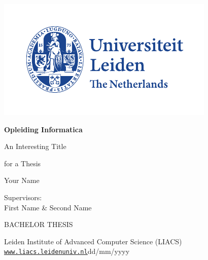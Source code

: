 \thispagestyle{empty}

\includegraphics{logoleiden}

\vspace{-2.5cm}\hfill \begin{huge}\textbf{Opleiding Informatica}\end{huge}

\vspace{5cm}
\begin{Large}
\hfill An Interesting Title

\vspace*{3mm}

\hfill for a Thesis

\vspace*{14mm}

\hfill Your Name
\end{Large}

\vspace*{6.0cm}

\begin{large}

Supervisors:\\
First Name \& Second Name


\vspace*{2.8cm}
BACHELOR THESIS

\vspace*{5mm}
Leiden Institute of Advanced Computer Science (LIACS)\\
\href{www.liacs.leidenuniv.nl}{\underline{\texttt{www.liacs.leidenuniv.nl}}}\hfill dd/mm/yyyy
\end{large}

\newpage

